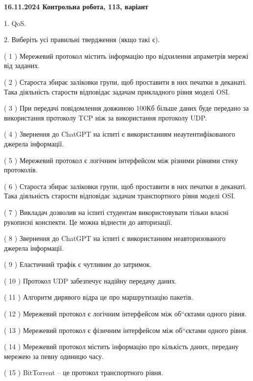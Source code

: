\documentclass[12pt, ukrainian]{article}
\begin{document}
\vspace{4mm}
\newpage
\begin {large}

\textbf{16.11.2024 Контрольна робота, 113, варіант  }\par


{
1. QoS.



\vspace{5mm}
2. Виберіть усі правильні твердження (якщо такі є).\par
\vspace{2mm}

( 1 ) Мережевий протокол містить інформацію про відхилення апраметрів мережі від заданих.

( 2 ) Староста збирає заліковки групи, щоб проставити в них печатки в деканаті. Така діяльність старости відповідає задачам прикладного рівня моделі OSI.

( 3 ) При передачі повідомлення довжиною 100Кб більше даних буде передано за використання протоколу TCP ніж за використання протоколу UDP.

( 4 ) Звернення до ChatGPT на іспиті є використанням неаутентифікованого джерела інформації.

( 5 ) Мережевий протокол є логічним інтерфейсом між різними рівнями стеку протоколів.

( 6 ) Староста збирає заліковки групи, щоб проставити в них печатки в деканаті. Така діяльність старости відповідає задачам транспортного рівня моделі OSI.

( 7 ) Викладач дозволив на іспиті студентам використовувати тільки власні рукописні конспекти. Це можна віднести до авторизації.

( 8 ) Звернення до ChatGPT на іспиті є використанням неавторизованого джерела інформації.

( 9 ) Еластичний трафік є чутливим до затримок.

( 10 ) Протокол UDP забезпечує надійну передачу даних.

( 11 ) Алгоритм дирявого відра це про маршрутизацію пакетів.

( 12 ) Мережевий протокол є логічним інтерфейсом між об“єктами одного рівня.

( 13 ) Мережевий протокол є фізичним інтерфейсом між об“єктами одного рівня.

( 14 ) Мережевий протокол містить інформацію про кількість даних, передану мережею за певну одиницю часу.

( 15 ) BitTorrent – це протокол транспортного рівня.
}
\end {large}
\end{document}
